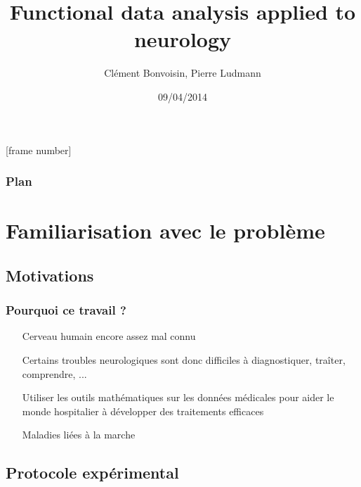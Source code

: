 \documentclass{beamer}
\title[Signal segmentation]{Functional data analysis applied to neurology}
\author{Clément Bonvoisin, Pierre Ludmann}
\institute{CMLA (ENS Cachan), Cognac-G (Paris V)}
\date{09/04/2014}
\begin{document}
[frame number]

\begin{frame}
\titlepage
\end{frame}

\begin{frame}
\frametitle{Plan}
  \tableofcontents[hideallsubsections]
\end{frame}


\section{Familiarisation avec le problème}
\subsection{Motivations}
\begin{frame}
	\frametitle{Pourquoi ce travail ?}
	\begin{itemize}
		\item[Cerveau] humain encore assez mal connu
		\item[Certains] troubles neurologiques sont donc difficiles à diagnostiquer, traîter, comprendre, ...
		\item[Utiliser] les outils mathématiques sur les données médicales pour aider le monde hospitalier à développer des traitements efficaces
		\item[Maladies] liées à la marche
	\end{itemize}	
\end{frame}

\subsection{Protocole expérimental}
\end{document}
